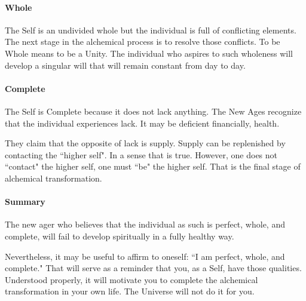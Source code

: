 \paragraph{Whole}
The Self is an undivided whole but the individual is full of conflicting elements. The next stage in the alchemical process is to resolve those conflicts. To be Whole means to be a Unity. The individual who aspires to such wholeness will develop a singular will that will remain constant from day to day.

\paragraph{Complete}
The Self is Complete because it does not lack anything. The New Ages recognize that the individual experiences lack. It may be deficient financially, health.

They claim that the opposite of lack is supply. Supply can be replenished by contacting the ``higher self". In a sense that is true. However, one does not ``contact" the higher self, one must ``be" the higher self. That is the final stage of alchemical transformation.

\paragraph{Summary}
The new ager who believes that the individual as such is perfect, whole, and complete, will fail to develop spiritually in a fully healthy way.

Nevertheless, it may be useful to affirm to oneself: ``I am perfect, whole, and complete." That will serve as a reminder that you, as a Self, have those qualities. Understood properly, it will motivate you to complete the alchemical transformation in your own life. The Universe will not do it for you.



